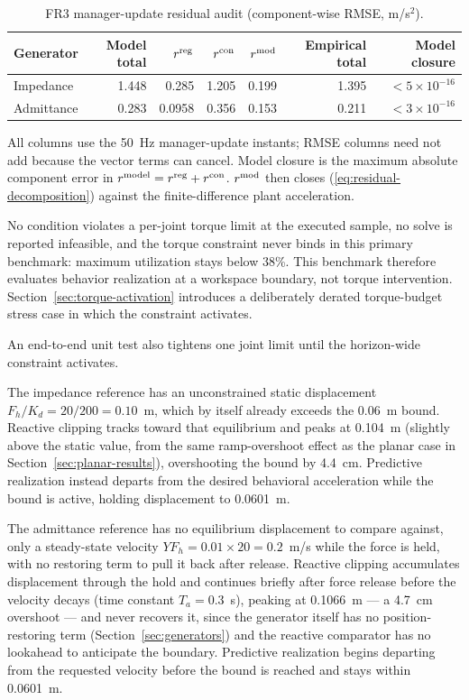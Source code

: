 \documentclass[journal]{IEEEtran}
\begin{document}
\begin{table}[t]
\centering
\caption{FR3 manager-update residual audit (component-wise RMSE, m/s$^2$).}
\label{tab:fr3-decomposition}
\small
\begin{tabular}{@{}lrrrrrr@{}}
\toprule
Generator & Model total & $r^{\rm reg}$ & $r^{\rm con}$ & $r^{\rm mod}$ & Empirical total & Model closure \\
\midrule
Impedance  & 1.448 & 0.285 & 1.205 & 0.199 & 1.395 & $<5\!\times\!10^{-16}$ \\
Admittance & 0.283 & 0.0958 & 0.356 & 0.153 & 0.211 & $<3\!\times\!10^{-16}$ \\
\bottomrule
\end{tabular}

\vspace{2pt}
\raggedright\footnotesize
All columns use the 50~Hz manager-update instants; RMSE columns need not
add because the vector terms can cancel. Model closure is the maximum
absolute component error in $r^{\rm model}=r^{\rm reg}+r^{\rm con}$.
$r^{\rm mod}$ then closes (\ref{eq:residual-decomposition}) against the
finite-difference plant acceleration.
\end{table}

No condition violates a per-joint torque limit at the executed sample,
no solve is reported infeasible, and the torque constraint never binds
in this primary benchmark: maximum utilization stays below 38\%. This
benchmark therefore evaluates behavior realization at a workspace
boundary, not torque intervention. Section~\ref{sec:torque-activation}
introduces a deliberately derated torque-budget stress case in which the
constraint activates.

An end-to-end unit test also tightens one joint limit until the
horizon-wide constraint activates.

The impedance reference has an unconstrained static displacement
$F_h/K_d=20/200=0.10$~m, which by itself already exceeds the 0.06~m
bound. Reactive clipping tracks toward that equilibrium and peaks at
0.104~m (slightly above the static value, from the same ramp-overshoot
effect as the planar case in Section~\ref{sec:planar-results}),
overshooting the bound by 4.4~cm. Predictive realization instead departs
from the desired behavioral acceleration while the bound is active,
holding displacement to 0.0601~m.

The admittance reference has no equilibrium displacement to compare
against, only a steady-state velocity $Y F_h=0.01\times20=0.2$~m/s while
the force is held, with no restoring term to pull it back after release.
Reactive clipping accumulates displacement through the hold and
continues briefly after force release before the velocity decays (time
constant $T_a=0.3$~s), peaking at 0.1066~m --- a 4.7~cm overshoot ---
and never recovers it, since the generator itself has no
position-restoring term (Section~\ref{sec:generators}) and the reactive
comparator has no lookahead to anticipate the boundary. Predictive
realization begins departing from the requested velocity before the
bound is reached and stays within 0.0601~m.
\end{document}
